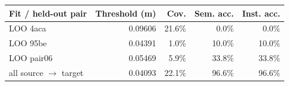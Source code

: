 \begin{tabular}{lrrrr}
\toprule
Fit / held-out pair & Threshold (m) & Cov. & Sem. acc. & Inst. acc. \\
\midrule
LOO 4aca & 0.09606 & 21.6\% & 0.0\% & 0.0\% \\
LOO 95be & 0.04391 & 1.0\% & 10.0\% & 10.0\% \\
LOO pair06 & 0.05469 & 5.9\% & 33.8\% & 33.8\% \\
all source $\rightarrow$ target & 0.04093 & 22.1\% & 96.6\% & 96.6\% \\
\bottomrule
\end{tabular}
